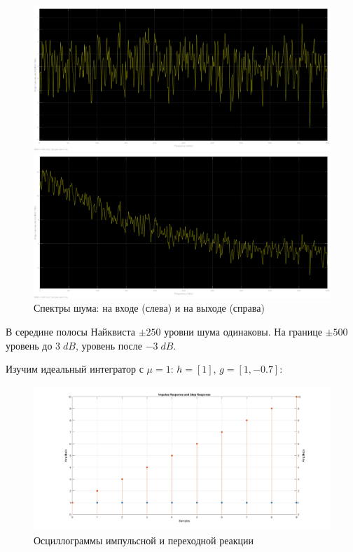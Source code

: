 \documentclass[12pt,a4paper]{article}
\begin{document}
	\begin{figure}[H]
		\centering
		\begin{minipage}[b]{.5\textwidth}
			\includegraphics[width=0.9\linewidth]{res/2_6_before.png}
		\end{minipage}%
		\begin{minipage}[b]{.5\textwidth}
			\includegraphics[width=0.9\linewidth]{res/2_6_after.png}
		\end{minipage}
		\caption*{Спектры шума: на входе (слева) и на выходе (справа)}
	\end{figure}
	
	В середине полосы Найквиста $\pm 250$ уровни шума одинаковы. На границе $\pm 500$ уровень до $3 \; dB$, уровень после $-3 \; dB$.
	
	Изучим идеальный интегратор с $\mu = 1$: $h = [1]$, $g = [1, -0.7]$:
	
	\begin{figure}[H]
		\centering
		\includegraphics[width=1.0\linewidth]{res/2_7_ideal.png}
		\caption{Осциллограммы импульсной и переходной реакции}
	\end{figure}
	
\end{document}
